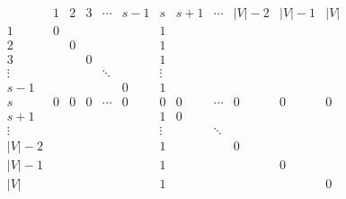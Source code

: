 \begin{solution}
\begin{align*}
  \begin{array}{c|ccccccccccc}
            & 1 & 2 & 3 & \cdots & s - 1 & s      & s + 1 & \cdots & |V| - 2 & |V| - 1 & |V| \\
    \hline
    1       & 0 &   &   &        &       & 1      &       &        &         &         &     \\
    2       &   & 0 &   &        &       & 1      &       &        &         &         &     \\
    3       &   &   & 0 &        &       & 1      &       &        &         &         &     \\
    \vdots  &   &   &   & \ddots &       & \vdots &       &        &         &         &     \\
    s - 1   &   &   &   &        & 0     & 1      &       &        &         &         &     \\
    s       & 0 & 0 & 0 & \cdots & 0     & 0      & 0     & \cdots & 0       & 0       & 0   \\
    s + 1   &   &   &   &        &       & 1      & 0     &        &         &         &     \\
    \vdots  &   &   &   &        &       & \vdots &       & \ddots &         &         &     \\
    |V| - 2 &   &   &   &        &       & 1      &       &        & 0       &         &     \\
    |V| - 1 &   &   &   &        &       & 1      &       &        &         & 0       &     \\
    |V|     &   &   &   &        &       & 1      &       &        &         &         & 0
  \end{array}
\end{align*}


\end{solution}
